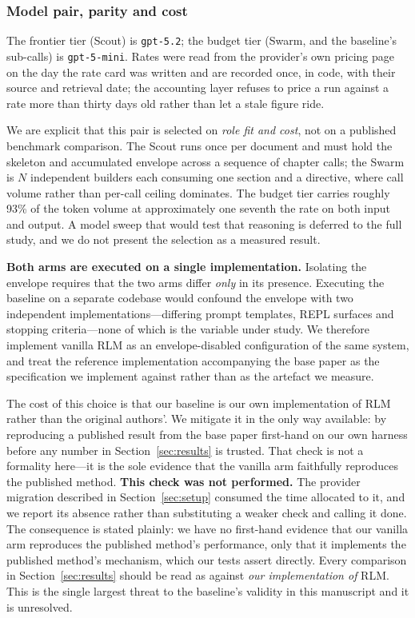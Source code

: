 \documentclass[conference]{IEEEtran}
\begin{document}
\subsubsection{Model pair, parity and cost}
The frontier tier (Scout) is \texttt{gpt-5.2}; the budget tier (Swarm, and the
baseline's sub-calls) is \texttt{gpt-5-mini}. Rates were read from the
provider's own pricing page on the day the rate card was written and are
recorded once, in code, with their source and retrieval date; the accounting
layer refuses to price a run against a rate more than thirty days old rather
than let a stale figure ride.

We are explicit that this pair is selected on \emph{role fit and cost}, not on
a published benchmark comparison. The Scout runs once per document and must
hold the skeleton and accumulated envelope across a sequence of chapter calls;
the Swarm is $N$ independent builders each consuming one section and a
directive, where call volume rather than per-call ceiling dominates. The
budget tier carries roughly 93\% of the token volume at approximately one
seventh the rate on both input and output. A model sweep that would test that
reasoning is deferred to the full study, and we do not present the selection
as a measured result.

\noindent\textbf{Both arms are executed on a single implementation.}
Isolating the envelope requires that the two arms differ \emph{only} in its
presence. Executing the baseline on a separate codebase would confound the
envelope with two independent implementations---differing prompt templates,
REPL surfaces and stopping criteria---none of which is the variable under
study. We therefore implement vanilla RLM as an envelope-disabled
configuration of the same system, and treat the reference implementation
accompanying the base paper \cite{zhang2025rlm} as the specification we
implement against rather than as the artefact we measure.

The cost of this choice is that our baseline is our own implementation of RLM
rather than the original authors'. We mitigate it in the only way available:
by reproducing a published result from the base paper first-hand on our own
harness before any number in Section~\ref{sec:results} is trusted. That check
is not a formality here---it is the sole evidence that the vanilla arm
faithfully reproduces the published method.
\textbf{This check was not performed.} The provider migration described in
Section~\ref{sec:setup} consumed the time allocated to it, and we report its
absence rather than substituting a weaker check and calling it done. The
consequence is stated plainly: we have no first-hand evidence that our vanilla
arm reproduces the published method's performance, only that it implements the
published method's mechanism, which our tests assert directly. Every
comparison in Section~\ref{sec:results} should be read as against
\emph{our implementation of} RLM. This is the single largest threat to the
baseline's validity in this manuscript and it is unresolved.
\end{document}
